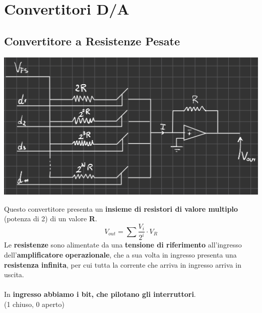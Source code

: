 \chapter{Convertitori D/A}
\section{Convertitore a Resistenze Pesate}
\begin{center}
    \includegraphics[width=\textwidth]{Images/figure37.png}
\end{center}
Questo convertitore presenta un \textbf{insieme di resistori di valore multiplo} (potenza di 2) di un valore \textbf{R}.
\begin{equation*}
    V_{out} = \sum \frac{V_i}{2^i} \cdot V_R
\end{equation*}
Le \textbf{resistenze} sono alimentate da una \textbf{tensione di riferimento} all'ingresso dell'\textbf{amplificatore} \textbf{operazionale}, che a sua volta in ingresso presenta una \textbf{resistenza infinita}, per cui tutta la corrente che arriva in ingresso arriva in uscita.\\ \\
In \textbf{ingresso abbiamo i bit, che pilotano gli interruttori}.\\
(1 chiuso, 0 aperto)
